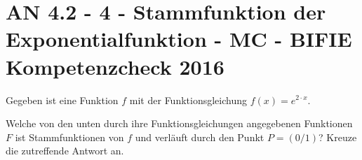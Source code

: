 \section{AN 4.2 - 4 - Stammfunktion der Exponentialfunktion - MC - BIFIE Kompetenzcheck 2016}

\begin{beispiel}[AN 4.2]{1} %
				Gegeben ist eine Funktion $f$ mit der Funktionsgleichung $f(x)=e^{2\cdot x}$.
				
				Welche von den unten durch ihre Funktionsgleichungen angegebenen Funktionen $F$ ist Stammfunktionen von $f$ und verläuft durch den Punkt $P=(0/1)$?
				Kreuze die zutreffende Antwort an.
				
\end{beispiel}	